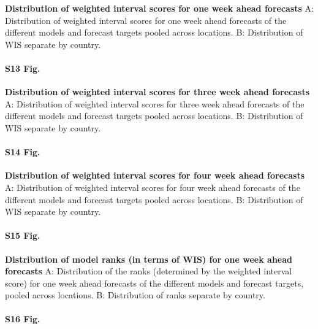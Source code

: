 \documentclass[10pt,letterpaper]{article}
\begin{document}
\textbf{Distribution of weighted interval scores for one week ahead forecasts}
A: Distribution of weighted interval scores for one week ahead forecasts
of the different models and forecast targets pooled across locations. B:
Distribution of WIS separate by country.

\paragraph{S13 Fig.}
\label{A: Distribution of weighted interval scores for three week ahead forecasts of the different models and forecast targets pooled across locations. B: Distribution of WIS separate by country.}

\textbf{Distribution of weighted interval scores for three week ahead forecasts}
A: Distribution of weighted interval scores for three week ahead
forecasts of the different models and forecast targets pooled across
locations. B: Distribution of WIS separate by country.

\paragraph{S14 Fig.}
\label{A: Distribution of weighted interval scores for four week ahead forecasts of the different models and forecast targets pooled across locations. B: Distribution of WIS separate by country.}

\textbf{Distribution of weighted interval scores for four week ahead forecasts}
A: Distribution of weighted interval scores for four week ahead
forecasts of the different models and forecast targets pooled across
locations. B: Distribution of WIS separate by country.

\paragraph{S15 Fig.}
\label{fig:distribution-scores-ranks-1}

\textbf{Distribution of model ranks (in terms of WIS) for one week ahead forecasts}
A: Distribution of the ranks (determined by the weighted interval score)
for one week ahead forecasts of the different models and forecast
targets, pooled across locations. B: Distribution of ranks separate by
country.

\paragraph{S16 Fig.}
\label{A: Distribution of the ranks (determined by the weighted interval score) for two week ahead forecasts of the different models and forecast targets, pooled across locations. B: Distribution of ranks separate by country.}
\end{document}
